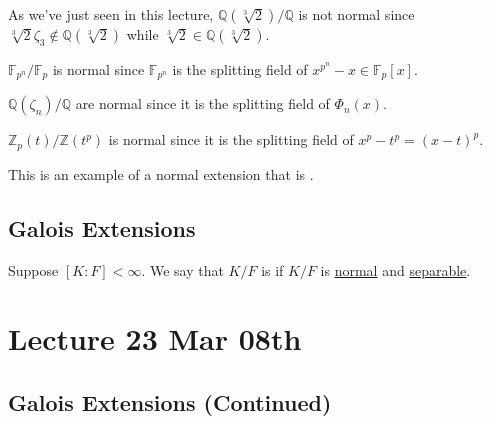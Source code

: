 \documentclass[notoc,notitlepage,nobib]{tufte-book}
\begin{document}
\begin{eg}
  As we've just seen in this lecture, $\mathbb{Q}(\sqrt[3]{2}) / \mathbb{Q}$ is
  not normal since $\sqrt[3]{2} \zeta_3 \notin \mathbb{Q}(\sqrt[3]{2})$ while
  $\sqrt[3]{2} \in \mathbb{Q}(\sqrt[3]{2})$.
\end{eg}

\begin{eg}
  $\mathbb{F}_{p^n} / \mathbb{F}_p$ is normal since $\mathbb{F}_{p^n}$ is the
  splitting field of $x^{p^n} - x \in \mathbb{F}_p[x]$.
\end{eg}

\begin{eg}
   $\mathbb{Q}(\zeta_n) / \mathbb{Q}$ are normal
  since it is the splitting field of $\Phi_n(x)$.
\end{eg}

\begin{eg}[\imponote]
  $\mathbb{Z}_p(t) / \mathbb{Z}(t^p)$ is normal since it is the splitting field
  of $x^p - t^p = (x - t)^p$.

  This is an example of a normal extension that is .
\end{eg}


\section{Galois Extensions}%
\label{sec:galois_extensions}

\begin{defn}\label{defn:galois_extension}
  Suppose $[ K : F ] < \infty$. We say that $K / F$ is  if $K /
  F$ is \hyperref[defn:normal_extension]{normal} and
  \hyperref[defn:separable_elements_and_separable_extensions]{separable}.
\end{defn}



\chapter{Lecture 23 Mar 08th}%
\label{chp:lecture_23_mar_08th}

\section{Galois Extensions (Continued)}%
\label{sec:galois_extensions_continued}
\end{document}
